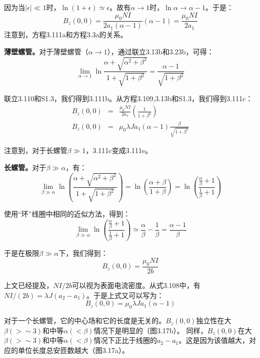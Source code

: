 因为当$|\epsilon|\ll 1$时，$\ln (1+\epsilon)\simeq \epsilon$。故有$\alpha\rightarrow 1$时，$\ln \alpha\rightarrow \alpha-1$。于是：
\begin{equation}
B_z(0,0)=\frac{\mu_0NI}{2a_1(\alpha-1)}(\alpha-1)=\frac{\mu_0NI}{2a_1}%
\end{equation}
注意到，方程3.111a和方程3.3a的关系。

\textbf{薄壁螺管。}对于薄壁螺管（$\alpha\rightarrow 1$），通过联立3.13b和3.23b，可得：
\begin{equation}
\lim_{\alpha\rightarrow 1}\ln\frac{\alpha+\sqrt{\alpha^2+\beta^2}}{1+\sqrt{1+\beta^2}}=\frac{\alpha-1}{\sqrt{1+\beta^2}}%
\end{equation}

联立3.110和S1.3，我们得到3.111b。从方程3.109,3.13b和S1.3，我们得到3.111c：
\begin{eqnarray}
B_z(0,0)&=&\frac{\mu_0 NI}{2a_1}(\frac{1}{1+\beta^2})\\ %
B_z(0,0)&=&\mu_0 \lambda Ja_1(\alpha-1)\frac{\beta}{\sqrt{1+\beta^2}}%
\end{eqnarray}

注意到，对于长螺管$\beta\gg 1$，3.111c变成3.111e。

\textbf{长螺管。}对于$\beta\gg \alpha$，有：
\begin{equation}
\lim_{\beta\gg\alpha}\ln\left(\frac{\alpha+\sqrt{\alpha^2+\beta^2}}{1+\sqrt{1+\beta^2}}\right)=\ln\left(\frac{\alpha+\beta}{1+\beta}\right)=\ln\left(\frac{\frac{\alpha}{\beta}+1}{\frac{1}{\beta}+1}\right)%
\end{equation}

使用“环”线圈中相同的近似方法，得到：
\begin{equation}
\lim_{\beta\gg\alpha}\ln(\frac{\frac{\alpha}{\beta}+1}{\frac{1}{\beta}+1})\simeq\frac{\alpha}{\beta}-\frac{1}{\beta}=\frac{\alpha-1}{\beta}%
\end{equation}

于是在极限$\beta\gg\alpha$下，我们得到：
\begin{equation}
B_z(0,0)=\frac{\mu_0NI}{2b}%
\end{equation}

上文已经提及，$NI/2b$可以视为表面电流密度。从式3.108中，有$NI/(2b)=\lambda J (a_2-a_1)$。于是上式又可以写为：
\begin{equation}
B_z(0,0)=\mu_0\lambda Ja_1(\alpha-1)%
\end{equation}

对于一个长螺管，它的中心场和它的长度是无关的。$B_z(0,0)$独立性在大$\beta(>\sim 3)$和中等$\alpha(<\beta)$情况下是明显的（图3.17b）。
同样，$B_z(0,0)$在大$\beta(>\sim 3)$和中等$\alpha(<\beta)$情况下正比于线圈的$a_2-a_1$。这是因为该值越大，对应的单位长度总安匝数越大（图3.17a）。

